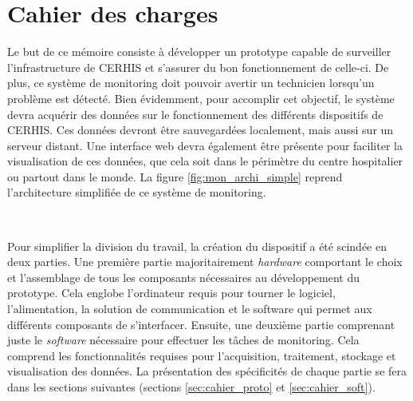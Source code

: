 \chapter{Cahier des charges}

Le but de ce mémoire consiste à développer un prototype capable de surveiller l’infrastructure de CERHIS et s’assurer du bon fonctionnement de celle-ci. De plus, ce système de monitoring doit pouvoir avertir un technicien lorsqu’un problème est détecté. Bien évidemment, pour accomplir cet objectif, le système devra acquérir des données sur le fonctionnement des différents dispositifs de CERHIS. Ces données devront être sauvegardées localement, mais aussi sur un serveur distant. Une interface web devra également être présente pour faciliter la visualisation de ces données, que cela soit dans le périmètre du centre hospitalier ou partout dans le monde. La figure \ref{fig:mon_archi_simple} reprend l’architecture simplifiée de ce système de monitoring.

~

\noindent
Pour simplifier la division du travail, la création du dispositif a été scindée en deux parties.
Une première partie majoritairement \textit{hardware} comportant le choix et l’assemblage de tous les composants nécessaires au développement du prototype. Cela englobe l’ordinateur requis pour tourner le logiciel, l’alimentation, la solution de communication et le software qui permet aux différents composants de s’interfacer. Ensuite, une deuxième partie comprenant juste le \textit{software} nécessaire pour effectuer les tâches de monitoring. Cela comprend les fonctionnalités requises pour l’acquisition, traitement, stockage et visualisation des données. La présentation des spécificités de chaque partie se fera dans les sections suivantes (sections \ref{sec:cahier_proto} et \ref{sec:cahier_soft}).

%
%
%
%


